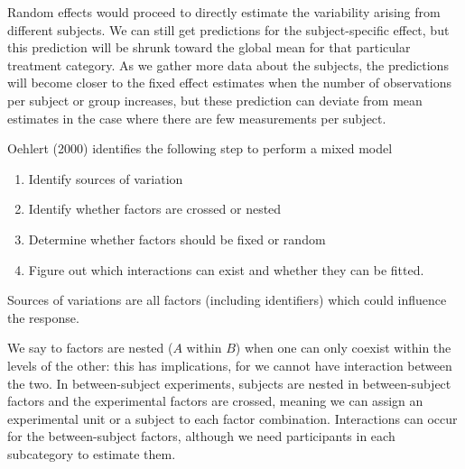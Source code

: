 \documentclass[
  11pt,
  letterpaper,
]{scrbook}
\providecommand{\tightlist}{%
  \setlength{\itemsep}{0pt}\setlength{\parskip}{0pt}}\usepackage{longtable,booktabs,array}
\theoremstyle{definition}
\theoremstyle{remark}
\begin{document}
Random effects would proceed to directly estimate the variability
arising from different subjects. We can still get predictions for the
subject-specific effect, but this prediction will be shrunk toward the
global mean for that particular treatment category. As we gather more
data about the subjects, the predictions will become closer to the fixed
effect estimates when the number of observations per subject or group
increases, but these prediction can deviate from mean estimates in the
case where there are few measurements per subject.

Oehlert (2000) identifies the following step to perform a mixed model

\begin{enumerate}
\def\labelenumi{\arabic{enumi}.}
\tightlist
\item
  Identify sources of variation
\item
  Identify whether factors are crossed or nested
\item
  Determine whether factors should be fixed or random
\item
  Figure out which interactions can exist and whether they can be
  fitted.
\end{enumerate}

Sources of variations are all factors (including identifiers) which
could influence the response.

We say to factors are nested (\(A\) within \(B\)) when one can only
coexist within the levels of the other: this has implications, for we
cannot have interaction between the two. In between-subject experiments,
subjects are nested in between-subject factors and the experimental
factors are crossed, meaning we can assign an experimental unit or a
subject to each factor combination. Interactions can occur for the
between-subject factors, although we need participants in each
subcategory to estimate them.
\end{document}
